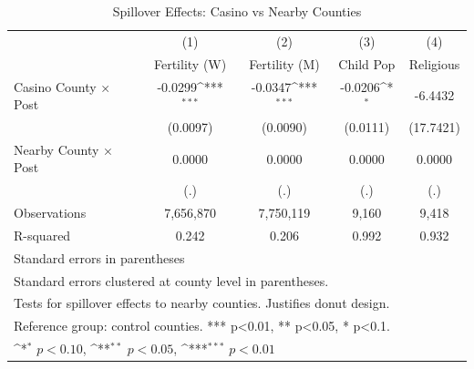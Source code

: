 \begin{table}[htbp]\centering
\def\sym#1{\ifmmode^{#1}\else\(^{#1}\)\fi}
\caption{Spillover Effects: Casino vs Nearby Counties}
\begin{tabular}{l*{4}{c}}
\hline\hline
            &\multicolumn{1}{c}{(1)}&\multicolumn{1}{c}{(2)}&\multicolumn{1}{c}{(3)}&\multicolumn{1}{c}{(4)}\\
            &\multicolumn{1}{c}{Fertility (W)}&\multicolumn{1}{c}{Fertility (M)}&\multicolumn{1}{c}{Child Pop}&\multicolumn{1}{c}{Religious}\\
\hline
Casino County × Post&     -0.0299\sym{***}&     -0.0347\sym{***}&     -0.0206\sym{*}  &     -6.4432         \\
            &    (0.0097)         &    (0.0090)         &    (0.0111)         &   (17.7421)         \\
[1em]
Nearby County × Post&      0.0000         &      0.0000         &      0.0000         &      0.0000         \\
            &         (.)         &         (.)         &         (.)         &         (.)         \\
\hline
Observations&   7,656,870         &   7,750,119         &       9,160         &       9,418         \\
R-squared   &       0.242         &       0.206         &       0.992         &       0.932         \\
\hline\hline
\multicolumn{5}{l}{\footnotesize Standard errors in parentheses}\\
\multicolumn{5}{l}{\footnotesize Standard errors clustered at county level in parentheses.}\\
\multicolumn{5}{l}{\footnotesize Tests for spillover effects to nearby counties. Justifies donut design.}\\
\multicolumn{5}{l}{\footnotesize Reference group: control counties. *** p<0.01, ** p<0.05, * p<0.1.}\\
\multicolumn{5}{l}{\footnotesize \sym{*} \(p<0.10\), \sym{**} \(p<0.05\), \sym{***} \(p<0.01\)}\\
\end{tabular}
\end{table}
